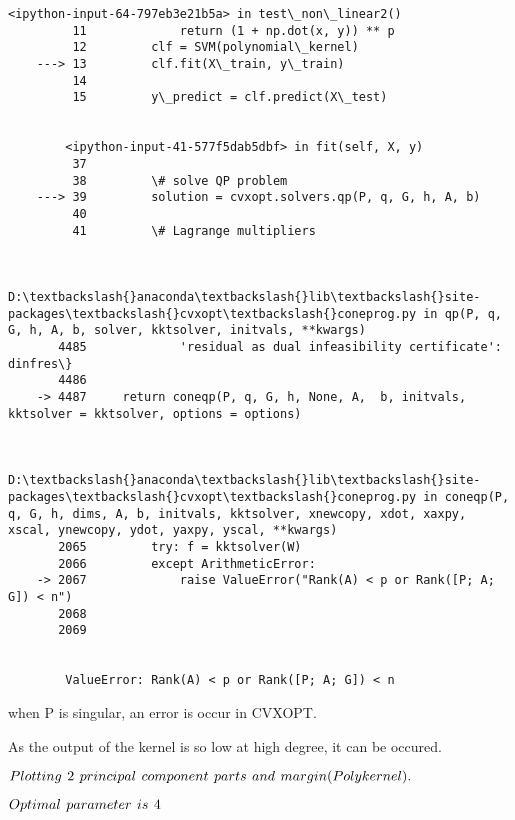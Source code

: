 \documentclass[11pt]{article}
\begin{document}
\begin{Verbatim}[commandchars=\\\{\}]
        <ipython-input-64-797eb3e21b5a> in test\_non\_linear2()
         11             return (1 + np.dot(x, y)) ** p
         12         clf = SVM(polynomial\_kernel)
    ---> 13         clf.fit(X\_train, y\_train)
         14 
         15         y\_predict = clf.predict(X\_test)
    

        <ipython-input-41-577f5dab5dbf> in fit(self, X, y)
         37 
         38         \# solve QP problem
    ---> 39         solution = cvxopt.solvers.qp(P, q, G, h, A, b)
         40 
         41         \# Lagrange multipliers
    

        D:\textbackslash{}anaconda\textbackslash{}lib\textbackslash{}site-packages\textbackslash{}cvxopt\textbackslash{}coneprog.py in qp(P, q, G, h, A, b, solver, kktsolver, initvals, **kwargs)
       4485             'residual as dual infeasibility certificate': dinfres\}
       4486 
    -> 4487     return coneqp(P, q, G, h, None, A,  b, initvals, kktsolver = kktsolver, options = options)
    

        D:\textbackslash{}anaconda\textbackslash{}lib\textbackslash{}site-packages\textbackslash{}cvxopt\textbackslash{}coneprog.py in coneqp(P, q, G, h, dims, A, b, initvals, kktsolver, xnewcopy, xdot, xaxpy, xscal, ynewcopy, ydot, yaxpy, yscal, **kwargs)
       2065         try: f = kktsolver(W)
       2066         except ArithmeticError:
    -> 2067             raise ValueError("Rank(A) < p or Rank([P; A; G]) < n")
       2068 
       2069 
    

        ValueError: Rank(A) < p or Rank([P; A; G]) < n

    \end{Verbatim}

\vspace{5ex}
    when P is singular, an error is occur in CVXOPT.

\vspace{1ex}
 As the output of the
kernel is so low at high degree, it can be occured.

\vspace{1ex}

    \(\large Plotting\ 2\ principal\ component\ parts\ and\ margin(Polykernel).\)

\vspace{1ex}
    \(\large Optimal\ parameter\ is\ 4\)


\vspace{1ex}
\end{document}
